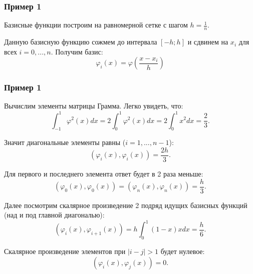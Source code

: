 \documentclass[10pt]{beamer}
\begin{document}
\begin{frame}[fragile]
\frametitle{Пример 1}
Базисные функции построим на равномерной сетке с шагом $h = \frac{1}{n}$.

\vfill
Данную базисную функцию сожмем до интервала $[-h; h]$ и сдвинем на $x_i$ для всех $i = 0, ..., n$. Получим базис:
\begin{equation*}
\varphi_i(x) = \varphi \left( \frac{x - x_i}{h} \right)
\end{equation*}
 
 \begin{center}
\end{center}

\end{frame}




\begin{frame}[fragile]
\frametitle{Пример 1}
Вычислим элементы матрицы Грамма. Легко увидеть, что: 
$$\int_{-1}^{1} \varphi^2(x) dx = 2 \int_{0}^{1} \varphi^2(x) dx = 2 \int_{0}^{1} x^2 dx = \frac{2}{3} .$$

Значит диагональные элементы равны ($i = 1, ..., n-1$):
$$(\varphi_i(x), \varphi_i(x)) = \frac{2h}{3} .$$

Для первого и последнего элемента ответ будет в 2 раза меньше:
$$(\varphi_0(x), \varphi_0(x)) = (\varphi_n(x), \varphi_n(x)) = \frac{h}{3} .$$

Далее посмотрим скалярное произведение 2 подряд идущих базисных функций (над и под главной диагональю):
$$(\varphi_i(x), \varphi_{i+1}(x)) = h \int_{0}^{1} (1 - x) x dx = \frac{h}{6} .$$

Скалярное произведение элементов при $|i-j|>1$ будет нулевое:
$$(\varphi_i(x), \varphi_j(x)) = 0.$$
\end{frame}
\end{document}
